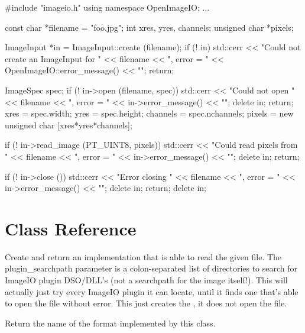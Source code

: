 \begin{code}
        #include "imageio.h"
        using namespace OpenImageIO;
        ...

        const char *filename = "foo.jpg";
        int xres, yres, channels;
        unsigned char *pixels;

        ImageInput *in = ImageInput::create (filename);
        if (! in) {
            std::cerr << "Could not create an ImageInput for " 
                      << filename << ", error = " 
                      << OpenImageIO::error_message() << "\n";
            return;
        }

        ImageSpec spec;
        if (! in->open (filename, spec)) {
            std::cerr << "Could not open " << filename 
                      << ", error = " << in->error_message() << "\n";
            delete in;
            return;
        }
        xres = spec.width;
        yres = spec.height;
        channels = spec.nchannels;
        pixels = new unsigned char [xres*yres*channels];

        if (! in->read_image (PT_UINT8, pixels)) {
            std::cerr << "Could read pixels from " << filename 
                      << ", error = " << in->error_message() << "\n";
            delete in;
            return;
        }

        if (! in->close ()) {
            std::cerr << "Error closing " << filename 
                      << ", error = " << in->error_message() << "\n";
            delete in;
            return;
        }
        delete in;
\end{code}



\section{\ImageInput Class Reference}
\label{sec:imageinput:reference}

Create and return an \ImageInput implementation that is able
to read the given file.  The {\kw plugin_searchpath} parameter is a
colon-separated list of directories to search for ImageIO plugin
DSO/DLL's (not a searchpath for the image itself!).  This will
actually just try every ImageIO plugin it can locate, until it
finds one that's able to open the file without error.  This just
creates the \ImageInput, it does not open the file.
\apiend

Return the name of the format implemented by this class.
\apiend


